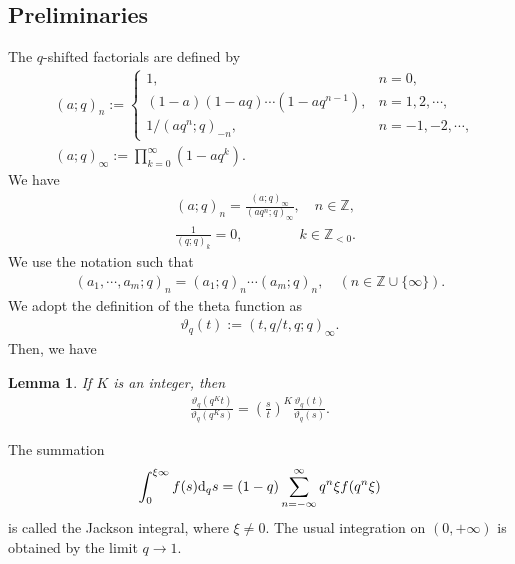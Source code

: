 \documentclass[12pt]{amsart}
\numberwithin{equation}{section}
\newtheorem{lemma}[thm]{\bf Lemma}
\theoremstyle{definition}
\theoremstyle{remark}
\begin{document}
\subsection{Preliminaries}
The $q$-shifted factorials are defined by
  \begin{align*}
    &(a; q)_{n} :=
    \begin{cases}
      1, & n = 0, \\
      (1 - a) (1-aq) \cdots(1 - aq^{n - 1}), & n = 1, 2, \cdots , \\
     1/(aq^{n}; q)_{-n}, & n = -1, -2, \cdots ,
    \end{cases} \\
    &(a; q)_{\infty} := \prod_{k = 0}^{\infty} (1 - aq^{k}) .
  \end{align*}
We have
  \begin{align}
 & (a; q)_{n} = \frac{(a; q)_{\infty}}{(aq^{n}; q)_\infty}, \quad n \in \mathbb{Z} , \label{eq:GR1.2.30} \\
 & \frac{1}{(q; q)_{k}} = 0, \qquad \qquad  k \in \mathbb{Z}_{< 0} . \label{eq:qshift0}
  \end{align}
We use the notation such that
  \begin{align*}
    (a_{1}, \cdots, a_{m}; q)_{n} = (a_{1}; q)_{n} \cdots (a_{m}; q)_{n}, \quad (n \in \mathbb{Z} \cup \{\infty\}).
  \end{align*}
We adopt the definition of the theta function as
\begin{align} 
\label{def:theta}
    \vartheta_{q}(t) := (t, q/t, q; q)_{\infty}.
\end{align}
Then, we have 
  \begin{lemma} \label{lem:theta}
If $K$ is an integer, then 
   \begin{align*}
      \frac{\vartheta_{q}\left(q^{K}t \right)}{\vartheta_{q}\left(q^{K}s \right)} = \left(\frac{s}{t}\right)^{K} \frac{\vartheta_{q}\left(t \right)}{\vartheta_{q}\left(s \right)}.
    \end{align*}
  \end{lemma}
The summation 
  \begin{align*}
    \int_{0}^{\xi \infty} f(s) {\rm{d}}_{q}s = (1 - q) \sum_{n = - \infty}^{\infty} q^{n} \xi f(q^{n}   \xi)
  \end{align*}
is called the Jackson integral, where $\xi \neq 0 $.
The usual integration on $(0, +\infty )$ is obtained by the limit $q \to 1$.
\end{document}
